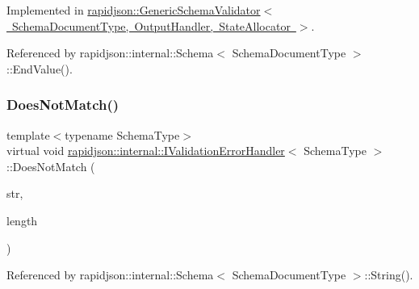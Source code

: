 Implemented in \mbox{\hyperlink{classrapidjson_1_1_generic_schema_validator_a5dd6854ff499756cc6f5bc20b24b5feb}{rapidjson\+::\+Generic\+Schema\+Validator$<$ Schema\+Document\+Type, Output\+Handler, State\+Allocator $>$}}.



Referenced by rapidjson\+::internal\+::\+Schema$<$ Schema\+Document\+Type $>$\+::\+End\+Value().

\mbox{\label{classrapidjson_1_1internal_1_1_i_validation_error_handler_a67070bdbe6ed6196e6e2a9755fa76c9c}} 
\subsubsection{\texorpdfstring{DoesNotMatch()}{DoesNotMatch()}}
{\footnotesize\ttfamily template$<$typename Schema\+Type$>$ \\
virtual void \mbox{\hyperlink{classrapidjson_1_1internal_1_1_i_validation_error_handler}{rapidjson\+::internal\+::\+I\+Validation\+Error\+Handler}}$<$ Schema\+Type $>$\+::Does\+Not\+Match (\begin{DoxyParamCaption}\item[{const \mbox{\hyperlink{classrapidjson_1_1internal_1_1_i_validation_error_handler_a02c672a313401138fd08504062f3d1d0}{Ch}} $\ast$}]{str,  }\item[{\mbox{\hyperlink{namespacerapidjson_a44eb33eaa523e36d466b1ced64b85c84}{Size\+Type}}}]{length }\end{DoxyParamCaption})\hspace{0.3cm}{\ttfamily [pure virtual]}}



Referenced by rapidjson\+::internal\+::\+Schema$<$ Schema\+Document\+Type $>$\+::\+String().

\mbox{\label{classrapidjson_1_1internal_1_1_i_validation_error_handler_aab9c02cddc12ea284c53d83193322e49}} 
